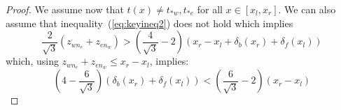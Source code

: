 \begin{proof}
%
%
%
%
%
%
%
%
%

We assume now that $t(x) \not= t_{*w}, t_{*e}$ for all $x \in [x_l,x_r]$.
We can also assume that
inequality~(\ref{eq:keyineq2}) does not hold which implies
\[\frac{2}{\sqrt{3}}(z_{wn_e} +z_{en_w}) > \left(\frac{4}{\sqrt{3}}-2\right)(x_r - x_l + \delta_b(x_r)+\delta_f(x_l))
\]
which, using $z_{wn_e} +z_{en_w} \leq x_r - x_l$, implies:
\begin{equation}
\label{eq:keyineq3}
\left(4 - \frac{6}{\sqrt{3}}\right)(\delta_b(x_r)+\delta_f(x_l)) < \left(\frac{6}{\sqrt{3}}-2\right)(x_r - x_l)
\end{equation}


\end{proof}
